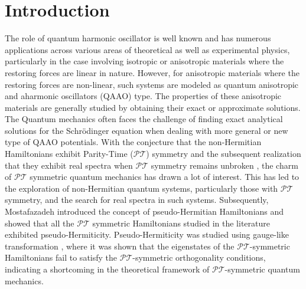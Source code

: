 \documentclass[a4paper, 12pt]{article}
\begin{document}
\section{Introduction}
The role of quantum harmonic oscillator is well known and has numerous applications across various areas of theoretical as well as experimental physics, particularly in the case involving isotropic or anisotropic materials where the restoring forces are linear in nature. However,  for anisotropic materials where the restoring forces are non-linear, such systems  are modeled as quantum anisotropic and aharmonic oscillators (QAAO) type. The properties of these anisotropic materials are generally studied by obtaining their exact or approximate solutions.  
The Quantum mechanics often faces the challenge of finding exact analytical solutions for the Schrödinger equation when dealing with more general or new type of QAAO potentials. With the conjecture that the non-Hermitian Hamiltonians exhibit Parity-Time ($\mathcal{PT}$) symmetry \cite{bender1998real} and the subsequent realization that they exhibit real spectra when $\mathcal{PT}$ symmetry remains unbroken \cite{bender2002complex, khare2000pt}, the charm of $\mathcal{PT}$ symmetric quantum mechanics has drawn a lot of interest. This has led to the exploration of non-Hermitian quantum systems, particularly those with $\mathcal{PT}$ symmetry, and the search for real spectra in such systems.  Subsequently, Mostafazadeh \cite{mostafazadeh2002pseudo1, mostafazadeh2002pseudo2, mostafazadeh2002pseudo3} introduced the concept of pseudo-Hermitian Hamiltonians and showed that all the $\mathcal{PT}$ symmetric Hamiltonians studied in the literature exhibited pseudo-Hermiticity. Pseudo-Hermiticity was studied using gauge-like transformation \cite{ahmed2002pseudo}, where it was shown that the eigenstates of the $\mathcal{PT}$-symmetric Hamiltonians fail to satisfy the $\mathcal{PT}$-symmetric orthogonality conditions, indicating a shortcoming in the theoretical framework of $\mathcal{PT}$-symmetric quantum mechanics.
\end{document}
